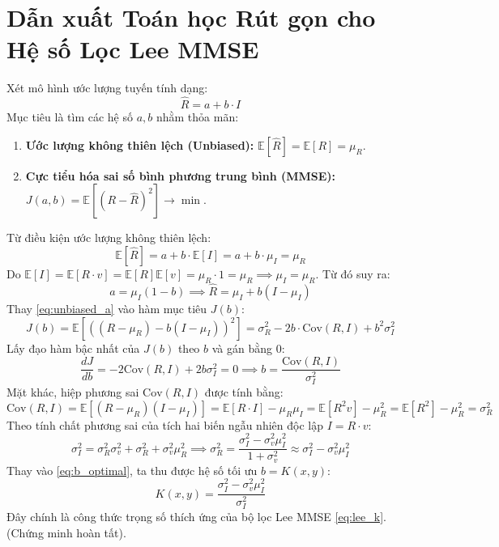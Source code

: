 \section{Dẫn xuất Toán học Rút gọn cho Hệ số Lọc Lee MMSE}
\label{sec:derivation_lee}
Xét mô hình ước lượng tuyến tính dạng:
\begin{equation}
\hat{R} = a + b \cdot I
\label{eq:linear_estimator}
\end{equation}
Mục tiêu là tìm các hệ số $a, b$ nhằm thỏa mãn:
\begin{enumerate}
    \item \textbf{Ước lượng không thiên lệch (Unbiased):} $\mathbb{E}[\hat{R}] = \mathbb{E}[R] = \mu_R$.
    \item \textbf{Cực tiểu hóa sai số bình phương trung bình (MMSE):} $J(a, b) = \mathbb{E}[(R - \hat{R})^2] \to \min$.
\end{enumerate}

Từ điều kiện ước lượng không thiên lệch:
\begin{equation}
\mathbb{E}[\hat{R}] = a + b \cdot \mathbb{E}[I] = a + b \cdot \mu_I = \mu_R
\end{equation}
Do $\mathbb{E}[I] = \mathbb{E}[R \cdot v] = \mathbb{E}[R]\mathbb{E}[v] = \mu_R \cdot 1 = \mu_R \implies \mu_I = \mu_R$. Từ đó suy ra:
\begin{equation}
a = \mu_I(1 - b) \implies \hat{R} = \mu_I + b(I - \mu_I)
\label{eq:unbiased_a}
\end{equation}
Thay \eqref{eq:unbiased_a} vào hàm mục tiêu $J(b)$:
\begin{equation}
J(b) = \mathbb{E}\left[ \left( (R - \mu_R) - b(I - \mu_I) \right)^2 \right] = \sigma_R^2 - 2b \cdot \text{Cov}(R, I) + b^2 \sigma_I^2
\label{eq:error_func}
\end{equation}
Lấy đạo hàm bậc nhất của $J(b)$ theo $b$ và gán bằng 0:
\begin{equation}
\frac{d J}{d b} = -2\text{Cov}(R, I) + 2b \sigma_I^2 = 0 \implies b = \frac{\text{Cov}(R, I)}{\sigma_I^2}
\label{eq:b_optimal}
\end{equation}
Mặt khác, hiệp phương sai $\text{Cov}(R, I)$ được tính bằng:
\begin{equation}
\text{Cov}(R, I) = \mathbb{E}[(R - \mu_R)(I - \mu_I)] = \mathbb{E}[R \cdot I] - \mu_R \mu_I = \mathbb{E}[R^2 v] - \mu_R^2 = \mathbb{E}[R^2] - \mu_R^2 = \sigma_R^2
\end{equation}
Theo tính chất phương sai của tích hai biến ngẫu nhiên độc lập $I = R \cdot v$:
\begin{equation}
\sigma_I^2 = \sigma_R^2 \sigma_v^2 + \sigma_R^2 + \sigma_v^2 \mu_R^2 \implies \sigma_R^2 = \frac{\sigma_I^2 - \sigma_v^2 \mu_I^2}{1 + \sigma_v^2} \approx \sigma_I^2 - \sigma_v^2 \mu_I^2
\end{equation}
Thay vào \eqref{eq:b_optimal}, ta thu được hệ số tối ưu $b = K(x, y)$:
\begin{equation}
K(x, y) = \frac{\sigma_I^2 - \sigma_v^2 \mu_I^2}{\sigma_I^2}
\end{equation}
Đây chính là công thức trọng số thích ứng của bộ lọc Lee MMSE \eqref{eq:lee_k}. (Chứng minh hoàn tất).



